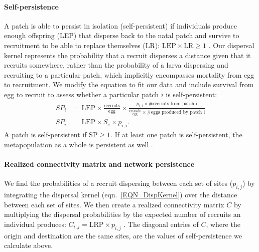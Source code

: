 \documentclass[12pt, oneside]{article}   	%
\begin{document}
\paragraph*{Self-persistence}

A patch is able to persist in isolation (self-persistent) if individuals produce enough offspring (LEP) that disperse back to the natal patch and survive to recruitment to be able to replace themselves (LR): $\text{LEP} \times \text{LR} \geq 1$ \citep{burgess2014beyond}. Our dispersal kernel represents the probability that a recruit disperses a distance given that it recruits somewhere, rather than the probability of a larva dispersing and recruiting to a particular patch, which implicitly encompasses mortality from egg to recruitment. We modify the equation to fit our data and include survival from egg to recruit to assess whether a particular patch $i$ is self-persistent: 
\begin{equation}
\begin{split}
SP_i &= \text{LEP} \times \frac{\text{recruits}}{\text{egg}} \times \frac{p_{i,i} \times \text{\# recruits from patch i}}{\frac{\text{recruits}}{\text{egg}} \times \text{\# eggs produced by patch i}} \\ 
SP_i &= \text{LEP} \times S_e \times p_{i,i}. \label{EQN_SP}
\end{split}
\end{equation}
A patch is self-persistent if $\text{SP} \geq 1$. If at least one patch is self-persistent, the metapopulation as a whole is persistent as well \citep{hastings_persistence_2006, burgess2014beyond}.

\paragraph*{Realized connectivity matrix and network persistence}
We find the probabilities of a recruit dispersing between each set of sites ($p_{i,j}$) by integrating the dispersal kernel (eqn.\ \ref{EQN_DispKernel}) over the distance between each set of sites. We then create a realized connectivity matrix $C$ by multiplying the dispersal probabilities by the expected number of recruits an individual produces: $C_{i,j} = \text{LRP} \times p_{i,j}$ \citep{burgess2014beyond}. The diagonal entries of $C$, where the origin and destination are the same sites, are the values of self-persistence we calculate above. 
\end{document}
